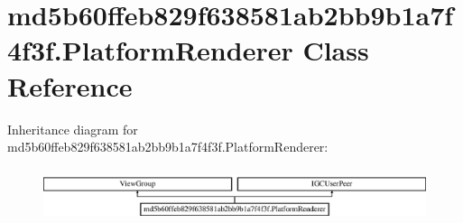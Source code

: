 \hypertarget{classmd5b60ffeb829f638581ab2bb9b1a7f4f3f_1_1PlatformRenderer}{}\section{md5b60ffeb829f638581ab2bb9b1a7f4f3f.\+Platform\+Renderer Class Reference}
\label{classmd5b60ffeb829f638581ab2bb9b1a7f4f3f_1_1PlatformRenderer}
Inheritance diagram for md5b60ffeb829f638581ab2bb9b1a7f4f3f.\+Platform\+Renderer\+:\begin{figure}[H]
\begin{center}
\leavevmode
\includegraphics[height=1.590909cm]{classmd5b60ffeb829f638581ab2bb9b1a7f4f3f_1_1PlatformRenderer}
\end{center}
\end{figure}
